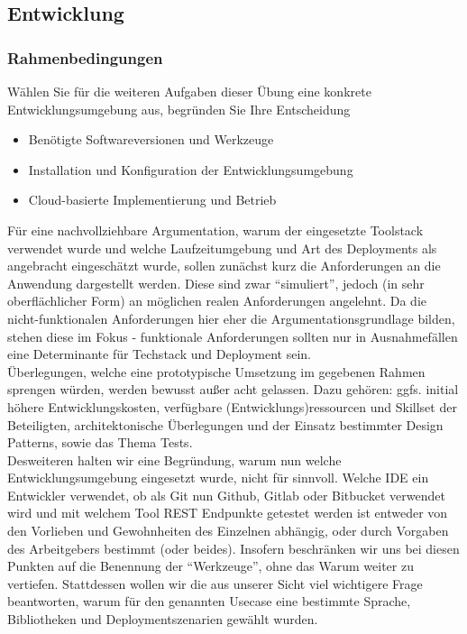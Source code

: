 \documentclass[notitlepage, hidelinks]{article}
\begin{document}
\subsection{Entwicklung}
\subsubsection{Rahmenbedingungen}
Wählen Sie für die weiteren Aufgaben dieser Übung eine konkrete Entwicklungsumgebung aus, begründen Sie Ihre Entscheidung
\begin{itemize}
\item Benötigte Softwareversionen und Werkzeuge
\item Installation und Konfiguration der Entwicklungsumgebung
\item Cloud-basierte Implementierung und Betrieb
\end{itemize}
 
 Für eine nachvollziehbare Argumentation, warum der eingesetzte Toolstack verwendet wurde und welche Laufzeitumgebung und Art des Deployments als angebracht eingeschätzt wurde, sollen zunächst kurz die Anforderungen an die Anwendung dargestellt werden. Diese sind zwar ``simuliert'', jedoch (in sehr oberflächlicher Form) an möglichen realen Anforderungen angelehnt. Da die nicht-funktionalen Anforderungen hier eher die Argumentationsgrundlage bilden, stehen diese im Fokus - funktionale Anforderungen sollten nur in Ausnahmefällen eine Determinante für Techstack und Deployment sein.  \\
Überlegungen, welche eine prototypische Umsetzung im gegebenen Rahmen sprengen würden, werden bewusst außer acht gelassen. Dazu gehören: ggfs. initial höhere Entwicklungskosten, verfügbare (Entwicklungs)ressourcen und Skillset der Beteiligten, architektonische Überlegungen und der Einsatz bestimmter Design Patterns, sowie das Thema Tests. \\
Desweiteren halten wir eine Begründung, warum nun welche Entwicklungsumgebung eingesetzt wurde, nicht für sinnvoll. Welche IDE ein Entwickler verwendet, ob als Git nun Github, Gitlab oder Bitbucket verwendet wird und mit welchem Tool REST Endpunkte getestet werden ist entweder von den Vorlieben und Gewohnheiten des Einzelnen abhängig, oder durch Vorgaben des Arbeitgebers bestimmt (oder beides). Insofern beschränken wir uns bei diesen Punkten auf die Benennung der ``Werkzeuge'', ohne das Warum weiter zu vertiefen. Stattdessen wollen wir die aus unserer Sicht viel wichtigere Frage beantworten, warum für den genannten Usecase eine bestimmte Sprache, Bibliotheken und Deploymentszenarien gewählt wurden.
 
\end{document}
